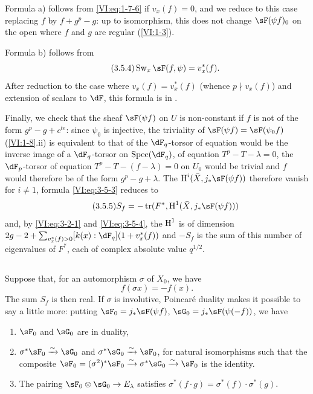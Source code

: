 Formula a) follows from \eqref{VI:eq:1-7-6} if $v_x(f)=0$, and we reduce
to this case replacing $f$ by $f+g^p-g$: up to isomorphism, this does not
change $\sF(\psi f)_0$ on the open where $f$ and $g$ are regular
(\ref{VI:1-3}).

Formula b) follows from 
\begin{equation*}\tag{3.5.4}\label{VI:eq:3-5-4}
  \swan_x \sF(f,\psi) = v_x^\ast(f) \text{.} 
\end{equation*}
After reduction to the case where $v_x(f)=v_x^\ast(f)$ (whence $p\nmid v_x(f)$)
and extension of scalars to $\dF$, this formula is in
\cite[4.4]{se61}.

Finally, we check that the sheaf $\sF(\psi f)$ on $U$ is non-constant if
$f$ is not of the form $g^p-g+c^{t e}$: since $\psi_0$ is injective, the
triviality of $\sF(\psi f)=\sF(\psi_0 f)$ (\ref{VI:1-8}.ii) is equivalent to
that of the $\dF_q$-torsor of equation would be the inverse image of a
$\dF_q$-torsor on $\spec(\dF_q)$, of equation $T^p-T-\lambda=0$, the
$\dF_p$-torsor of equation $T^p-T-(f-\lambda)=0$ on $U_0$ would be trivial
and $f$ would therefore be of the form $g^p-g+\lambda$. The
$\h^i(\bar X,j_\ast \sF(\psi f))$ therefore vanish for $i\ne 1$, formula
\eqref{VI:eq:3-5-3} reduces to 
\begin{equation*}\tag{3.5.5}\label{VI:eq:3-5-5}
  S_f = -\tr(F^\ast,\h^1(\bar X,j_\ast \sF(\psi f))) 
\end{equation*}
and, by \eqref{VI:eq:3-2-1} and \eqref{VI:eq:3-5-4}, the $\operatorname{H}^1$ is of
dimension $2 g-2+\sum_{v_x^\ast(f)>0} [k(x):\dF_q](1+v_x^\ast(f))$ and $-S_f$
is the sum of this number of eigenvalues of $F^\ast$, each of complex
absolute value $q^{1/2}$. 





\subsection{}\label{VI:3-6}

Suppose that, for an automorphism $\sigma$ of $X_0$, we have
\[
  f(\sigma x) = - f(x) \text{.}
\]
The sum $S_f$ is then real. If $\sigma$ is involutive, Poincaré
duality makes it possible to say a little more: putting
$\sF_0=j_\ast \sF(\psi f)$, $\sG_0 = j_\ast \sF(\psi(-f))$, we have
\begin{enumerate}[\indent a)]
  \item $\sF_0$ and $\sG_0$ are in duality,
  \item $\sigma^\ast \sF_0 \iso \sG_0$ and $\sigma^\ast \sG_0 \iso \sF_0$, for
    natural isomorphisms such that the composite
    $\sF_0=(\sigma^2)^\ast \sF_0 \iso \sigma^\ast \sG_0 \iso \sF_0$ is
    the identity.
  \item The pairing $\sF_0\otimes \sG_0 \to E_\lambda$ satisfies
    $\sigma^\ast(f\cdot g) = \sigma^\ast(f) \cdot \sigma^\ast (g)$.
\end{enumerate}

